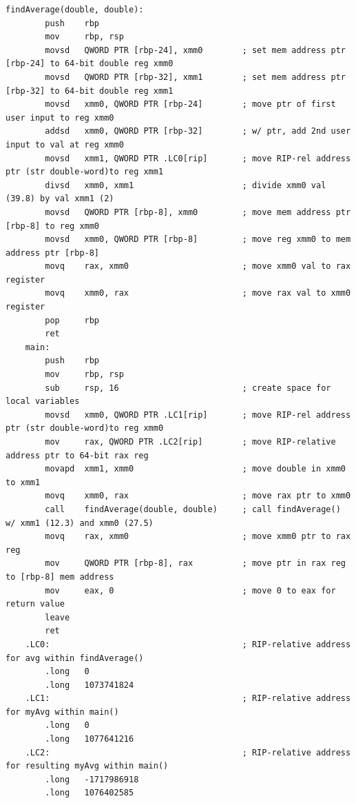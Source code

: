 \documentclass{article}
\theoremstyle{theorem}
\theoremstyle{definition}
\theoremstyle{remark}
\begin{document}
\medskip\noindent
\begin{lstlisting}[style=AsmStyle]
    findAverage(double, double):
        push    rbp
        mov     rbp, rsp
        movsd   QWORD PTR [rbp-24], xmm0        ; set mem address ptr [rbp-24] to 64-bit double reg xmm0
        movsd   QWORD PTR [rbp-32], xmm1        ; set mem address ptr [rbp-32] to 64-bit double reg xmm1
        movsd   xmm0, QWORD PTR [rbp-24]        ; move ptr of first user input to reg xmm0
        addsd   xmm0, QWORD PTR [rbp-32]        ; w/ ptr, add 2nd user input to val at reg xmm0
        movsd   xmm1, QWORD PTR .LC0[rip]       ; move RIP-rel address ptr (str double-word)to reg xmm1
        divsd   xmm0, xmm1                      ; divide xmm0 val (39.8) by val xmm1 (2)
        movsd   QWORD PTR [rbp-8], xmm0         ; move mem address ptr [rbp-8] to reg xmm0
        movsd   xmm0, QWORD PTR [rbp-8]         ; move reg xmm0 to mem address ptr [rbp-8]
        movq    rax, xmm0                       ; move xmm0 val to rax register
        movq    xmm0, rax                       ; move rax val to xmm0 register
        pop     rbp
        ret
    main:
        push    rbp
        mov     rbp, rsp
        sub     rsp, 16                         ; create space for local variables
        movsd   xmm0, QWORD PTR .LC1[rip]       ; move RIP-rel address ptr (str double-word)to reg xmm0
        mov     rax, QWORD PTR .LC2[rip]        ; move RIP-relative address ptr to 64-bit rax reg
        movapd  xmm1, xmm0                      ; move double in xmm0 to xmm1
        movq    xmm0, rax                       ; move rax ptr to xmm0
        call    findAverage(double, double)     ; call findAverage() w/ xmm1 (12.3) and xmm0 (27.5)
        movq    rax, xmm0                       ; move xmm0 ptr to rax reg
        mov     QWORD PTR [rbp-8], rax          ; move ptr in rax reg to [rbp-8] mem address
        mov     eax, 0                          ; move 0 to eax for return value
        leave
        ret
    .LC0:                                       ; RIP-relative address for avg within findAverage()
        .long   0
        .long   1073741824
    .LC1:                                       ; RIP-relative address for myAvg within main()
        .long   0
        .long   1077641216
    .LC2:                                       ; RIP-relative address for resulting myAvg within main()
        .long   -1717986918
        .long   1076402585
\end{lstlisting}
\end{document}
